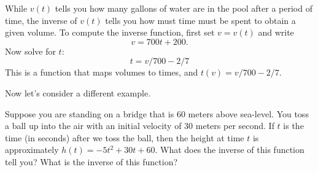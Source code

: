 \begin{solution}
While $v(t)$ tells you how many gallons of water are in the pool after
a period of time, the inverse of $v(t)$ tells you how must time must
be spent to obtain a given volume. To compute the inverse function,
first set $v=v(t)$ and write
\[
v = 700t + 200.
\]
Now solve for $t$:
\[
t = v/700 - 2/7
\]
This is a function that maps volumes to times, and 
$t(v) = v/700-2/7$.
\end{solution}


Now let's consider a different example.

\begin{example}
Suppose you are standing on a bridge that is 60 meters above
sea-level. You toss a ball up into the air with an initial velocity of
30 meters per second.  If $t$ is the time (in seconds) after we toss
the ball, then the height at time $t$ is approximately $h(t) = -5 t^2
+30t+60$. What does the inverse of this function tell you? What is the inverse
of this function?
\end{example}



